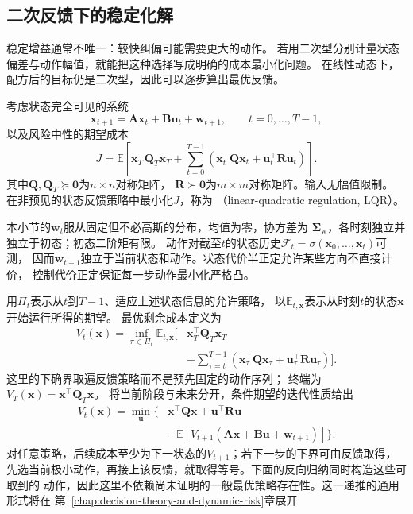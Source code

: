 \subsection{二次反馈下的稳定化解}
\label{sec:control-lqr-riccati}
稳定增益通常不唯一：较快纠偏可能需要更大的动作。
若用二次型分别计量状态偏差与动作幅值，就能把这种选择写成明确的成本最小化问题。
在线性动态下，配方后的目标仍是二次型，因此可以逐步算出最优反馈。
\begin{definition}[有限时域线性二次调节]
\label{def:control-finite-horizon-lqr}
考虑状态完全可见的系统
\begin{equation}
  \bm x_{t+1}=\bm A\bm x_t+\bm B\bm u_t+\bm w_{t+1},
  \qquad t=0,\ldots,T-1,
  \label{eq:control-lqr-dynamics}
\end{equation}
以及风险中性的期望成本
\begin{equation}
  J=\mathbb E\left[
  \bm x_T^\top\bm Q_T\bm x_T+
  \sum_{t=0}^{T-1}
  (\bm x_t^\top\bm Q\bm x_t+\bm u_t^\top\bm R\bm u_t)\right].
  \label{eq:control-lqr-cost}
\end{equation}
其中$\bm Q,\bm Q_T\succeq\bm0$为$n\times n$对称矩阵，
$\bm R\succ\bm0$为$m\times m$对称矩阵。输入无幅值限制。
在非预见的状态反馈策略中最小化$J$，称为
（linear-quadratic regulation, LQR）。
\end{definition}

本小节的$\bm w_t$服从固定但不必高斯的分布，均值为零，协方差为
$\bm\Sigma_{\mathrm w}$，各时刻独立并独立于初态；初态二阶矩有限。
动作对截至$t$的状态历史$\mathcal F_t=\sigma(\bm x_0,\ldots,\bm x_t)$可测，
因而$\bm w_{t+1}$独立于当前状态和动作。状态代价半正定允许某些方向不直接计价，
控制代价正定保证每一步动作最小化严格凸。

用$\Pi_t$表示从$t$到$T-1$、适应上述状态信息的允许策略，
以$\mathbb E_{t,\bm x}$表示从时刻$t$的状态$\bm x$开始运行所得的期望。
最优剩余成本定义为
\[
  \begin{aligned}
  V_t(\bm x)=\inf_{\pi\in\Pi_t}\mathbb E_{t,\bm x}\biggl[
    &\bm x_T^\top\bm Q_T\bm x_T\\
    &+\sum_{\tau=t}^{T-1}
      (\bm x_\tau^\top\bm Q\bm x_\tau+
       \bm u_\tau^\top\bm R\bm u_\tau)\biggr].
  \end{aligned}
\]
这里的下确界取遍反馈策略而不是预先固定的动作序列；
终端为$V_T(\bm x)=\bm x^\top\bm Q_T\bm x$。
将当前阶段与未来分开，条件期望的迭代性质给出
\begin{equation}
  \begin{aligned}
  V_t(\bm x)=\min_{\bm u}\bigl\{&
    \bm x^\top\bm Q\bm x+\bm u^\top\bm R\bm u\\
    &+\mathbb E[V_{t+1}(\bm A\bm x+\bm B\bm u+\bm w_{t+1})]\bigr\}.
  \end{aligned}
  \label{eq:control-lqr-bellman}
\end{equation}
对任意策略，后续成本至少为下一状态的$V_{t+1}$；若下一步的下界可由反馈取得，
先选当前极小动作，再接上该反馈，就取得等号。下面的反向归纳同时构造这些可取到的
动作，因此这里不依赖尚未证明的一般最优策略存在性。这一递推的通用形式将在
第~\ref{chap:decision-theory-and-dynamic-risk}章展开


